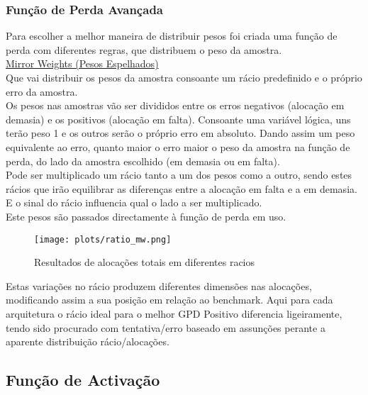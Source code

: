 

\subsubsection{Função de Perda Avançada}\label{se:advancedloss}

Para escolher a melhor maneira de distribuir pesos foi criada uma função de perda com diferentes regras, que distribuem o peso da amostra.\\
\href{https://github.com/alquimodelia/alquitable/blob/main/alquitable/advanced_losses.py#L33}{Mirror Weights (Pesos Espelhados)}\\
Que vai distribuir os pesos da amostra consoante um rácio predefinido e o próprio erro da amostra.\\
Os pesos nas amostras vão ser divididos entre os erros negativos (alocação em demasia) e os positivos (alocação em falta). Consoante uma variável lógica,  uns terão peso 1 e os outros serão o próprio erro em absoluto. Dando assim um peso equivalente ao erro, quanto maior o erro maior o peso da amostra na função de perda, do lado da amostra escolhido (em demasia ou em falta).\\
Pode ser multiplicado um rácio tanto a um dos pesos como a outro, sendo estes rácios que irão equilibrar as diferenças entre a alocação em falta e a em demasia. E o sinal do rácio influencia qual o lado a ser multiplicado.\\
Este pesos são passados directamente à função de perda em uso.\\


\begin{figure}[H]
    \centering
    \texttt{[image: plots/ratio\_mw.png]}
    \caption{Resultados de alocações totais em diferentes racios}
    \label{fig:resexpratiomw}
  \end{figure}

Estas variações no rácio produzem diferentes dimensões nas alocações, modificando assim a sua posição em relação ao benchmark. Aqui para cada arquitetura o rácio ideal para o melhor GPD Positivo diferencia ligeiramente, tendo sido procurado com tentativa/erro baseado em assunções perante a aparente distribuição rácio/alocações.\\


\subsection{Função de Activação}

